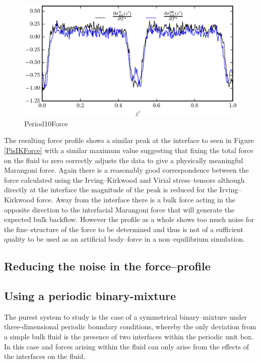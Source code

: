 \begin{figure}[h]
\centering
\includegraphics[scale=0.8]{Period10Force}
\caption{Period10Force}
\label{Period10Force}
\end{figure}
The resulting force profile shows a similar peak at the interface to seen in Figure \ref{PisIKForce} with a similar maximum value suggesting that fixing the total force on the fluid to zero correctly adjusts the data to give a physically meaningful Marangoni force.
Again there is a reasonably good correspondence between the force calculated using the Irving--Kirkwood and Virial stress--tensors although directly at the interface the magnitude of the peak is reduced for the Irving--Kirkwood force.
Away from the interface there is a bulk force acting in the opposite direction to the interfacial Marangoni force that will generate the expected bulk backflow.
However the profile as a whole shows too much noise for the fine--structure of the force to be determined and thus is not of a sufficient quality to be used as an artificial body--force in a non--equilibrium simulation.

\subsection{Reducing the noise in the force--profile}

 



\subsection{Using a periodic binary-mixture}
The purest system to study is the case of a symmetrical binary--mixture under three-dimensional periodic boundary conditions, whereby the only deviation from a simple bulk fluid is the presence of two interfaces within the periodic unit box. 
In this case and forces arising within the fluid can only arise from the effects of the interfaces on the fluid.

